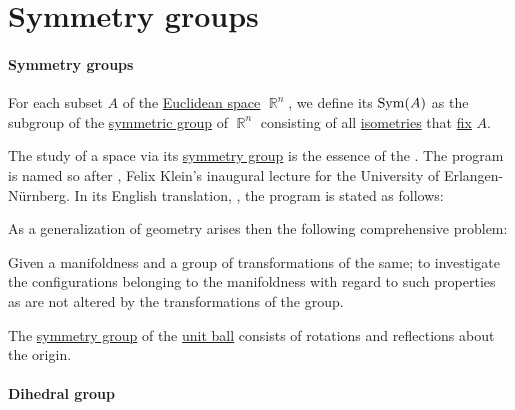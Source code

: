 \section{Symmetry groups}\label{sec:symmetry_groups}

\paragraph{Symmetry groups}

\begin{definition}\label{def:symmetry_group}
  For each subset \( A \) of the \hyperref[def:euclidean_space]{Euclidean space} \( \BbbR^n \), we define its  \( \op{Sym}(A) \) as the subgroup of the \hyperref[def:symmetric_group]{symmetric group} of \( \BbbR^n \) consisting of all \hyperref[def:isometry]{isometries} that \hyperref[def:function_fixed_point]{fix} \( A \).
\end{definition}

\begin{remark}\label{rem:erlangen_program}
  The study of a space via its \hyperref[def:symmetry_group]{symmetry group} is the essence of the . The program is named so after \cite{Klein1893ErlangenProgram}, Felix Klein's inaugural lecture for the University of Erlangen-N\"urnberg. In its English translation, \cite[218]{Klein1893ErlangenProgramEnglish}, the program is stated as follows:
  \begin{displayquote}
    As a generalization of geometry arises then the following comprehensive problem:
    \begin{displayquote}
      Given a manifoldness and a group of transformations of the same; to investigate the configurations belonging to the manifoldness with regard to such properties as are not altered by the transformations of the group.
    \end{displayquote}
  \end{displayquote}
\end{remark}

\begin{proposition}\label{thm:symmetry_group_of_sphere}
  The \hyperref[def:symmetry_group]{symmetry group} of the \hyperref[def:metric_space/ball]{unit ball} consists of rotations and reflections about the origin.
\end{proposition}

\paragraph{Dihedral group}

